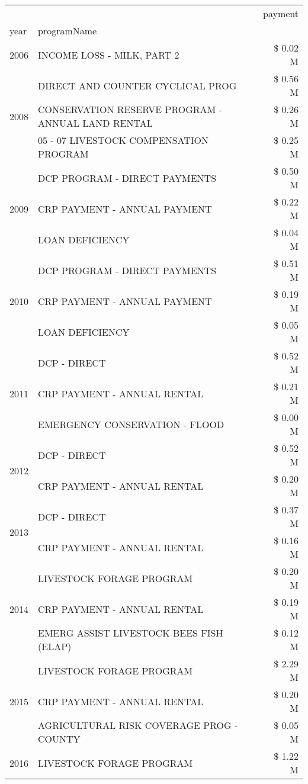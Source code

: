 \begin{tabular}{llr}
\toprule
 &  & payment \\
year & programName &  \\
\midrule
2006 & INCOME LOSS - MILK, PART 2 & \$ 0.02 M \\
\cline{1-3}
\multirow[t]{3}{*}{2008} & DIRECT AND COUNTER CYCLICAL PROG & \$ 0.56 M \\
 & CONSERVATION RESERVE PROGRAM - ANNUAL LAND RENTAL & \$ 0.26 M \\
 & 05 - 07 LIVESTOCK COMPENSATION PROGRAM & \$ 0.25 M \\
\cline{1-3}
\multirow[t]{3}{*}{2009} & DCP PROGRAM - DIRECT PAYMENTS & \$ 0.50 M \\
 & CRP PAYMENT - ANNUAL PAYMENT & \$ 0.22 M \\
 & LOAN DEFICIENCY & \$ 0.04 M \\
\cline{1-3}
\multirow[t]{3}{*}{2010} & DCP PROGRAM - DIRECT PAYMENTS & \$ 0.51 M \\
 & CRP PAYMENT - ANNUAL PAYMENT & \$ 0.19 M \\
 & LOAN DEFICIENCY & \$ 0.05 M \\
\cline{1-3}
\multirow[t]{3}{*}{2011} & DCP - DIRECT & \$ 0.52 M \\
 & CRP PAYMENT - ANNUAL RENTAL & \$ 0.21 M \\
 & EMERGENCY CONSERVATION - FLOOD & \$ 0.00 M \\
\cline{1-3}
\multirow[t]{2}{*}{2012} & DCP - DIRECT & \$ 0.52 M \\
 & CRP PAYMENT - ANNUAL RENTAL & \$ 0.20 M \\
\cline{1-3}
\multirow[t]{2}{*}{2013} & DCP - DIRECT & \$ 0.37 M \\
 & CRP PAYMENT - ANNUAL RENTAL & \$ 0.16 M \\
\cline{1-3}
\multirow[t]{3}{*}{2014} & LIVESTOCK FORAGE PROGRAM & \$ 0.20 M \\
 & CRP PAYMENT - ANNUAL RENTAL & \$ 0.19 M \\
 & EMERG ASSIST LIVESTOCK BEES FISH (ELAP) & \$ 0.12 M \\
\cline{1-3}
\multirow[t]{3}{*}{2015} & LIVESTOCK FORAGE PROGRAM & \$ 2.29 M \\
 & CRP PAYMENT - ANNUAL RENTAL & \$ 0.20 M \\
 & AGRICULTURAL RISK COVERAGE PROG - COUNTY & \$ 0.05 M \\
\cline{1-3}
\multirow[t]{3}{*}{2016} & LIVESTOCK FORAGE PROGRAM                      & \$ 1.22 M \\

\end{tabular}
